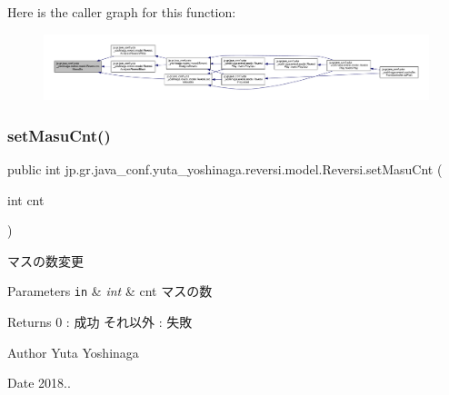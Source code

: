 Here is the caller graph for this function\+:
\nopagebreak
\begin{figure}[H]
\begin{center}
\leavevmode
\includegraphics[width=350pt]{classjp_1_1gr_1_1java__conf_1_1yuta__yoshinaga_1_1reversi_1_1model_1_1_reversi_a3c63579c27513dffc555416388f8530a_icgraph}
\end{center}
\end{figure}
\mbox{\label{classjp_1_1gr_1_1java__conf_1_1yuta__yoshinaga_1_1reversi_1_1model_1_1_reversi_a0e9bc15d570635cf024287fbf541b4b9}} 
\subsubsection{\texorpdfstring{set\+Masu\+Cnt()}{setMasuCnt()}}
{\footnotesize\ttfamily public int jp.\+gr.\+java\+\_\+conf.\+yuta\+\_\+yoshinaga.\+reversi.\+model.\+Reversi.\+set\+Masu\+Cnt (\begin{DoxyParamCaption}\item[{int}]{cnt }\end{DoxyParamCaption})}



マスの数変更 


\begin{DoxyParams}[1]{Parameters}
\mbox{\tt in}  & {\em int} & cnt マスの数 \\
\hline
\end{DoxyParams}
\begin{DoxyReturn}{Returns}
0 \+: 成功 それ以外 \+: 失敗 
\end{DoxyReturn}
\begin{DoxyAuthor}{Author}
Yuta Yoshinaga 
\end{DoxyAuthor}
\begin{DoxyDate}{Date}
2018.. 
\end{DoxyDate}


